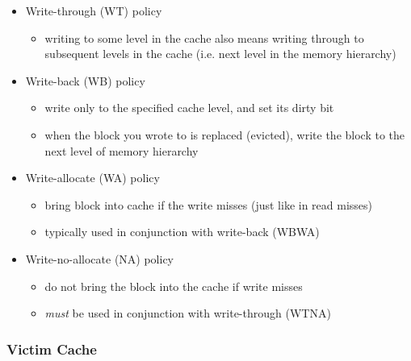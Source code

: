 \documentclass[12pt]{extarticle}
\begin{document}
	\begin{itemize}
		\item Write-through (WT) policy
		\begin{itemize}
			\item writing to some level in the cache also means writing through to subsequent levels in the cache (i.e. 
			next level in the memory hierarchy)
		\end{itemize}

		\item Write-back (WB) policy
		\begin{itemize}
			\item write only to the specified cache level, and set its dirty bit
			\item when the block you wrote to is replaced (evicted), write the block to the next level of memory hierarchy
		\end{itemize}

		\item Write-allocate (WA) policy
		\begin{itemize}
			\item bring block into cache if the write misses (just like in read misses)
			\item typically used in conjunction with write-back (WBWA)
		\end{itemize}

		\item Write-no-allocate (NA) policy
		\begin{itemize}
			\item do not bring the block into the cache if write misses
			\item \textit{must} be used in conjunction with write-through (WTNA)
		\end{itemize}
	\end{itemize}

	\subsubsection{Victim Cache}
\end{document}
